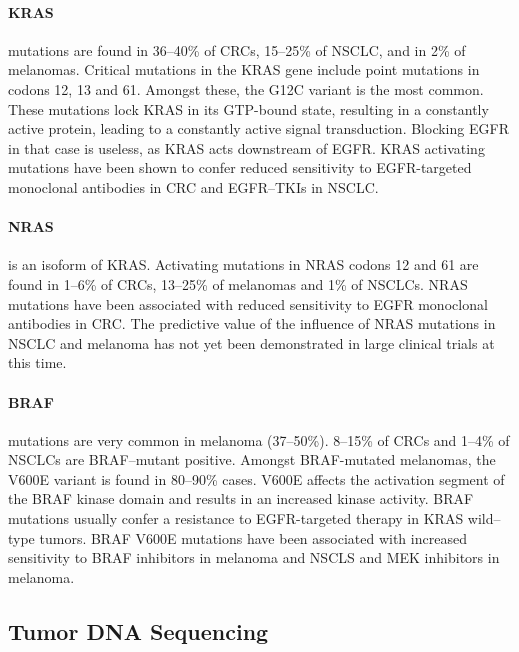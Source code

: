 {{      \paragraph{KRAS} mutations are found in 36--40\% of CRCs, 15--25\% of
      NSCLC, and in 2\% of melanomas. Critical mutations in the KRAS gene
      include point mutations in codons 12, 13 and 61. Amongst these, the G12C
      variant is the most common. These mutations lock KRAS in its GTP-bound
      state, resulting in a constantly active protein, leading to a constantly
      active signal transduction. Blocking EGFR in that case is useless, as KRAS
      acts downstream of EGFR. KRAS activating mutations have been shown to
      confer reduced sensitivity to EGFR-targeted monoclonal antibodies in CRC
      and EGFR--TKIs in NSCLC.

      \paragraph{NRAS} is an isoform of KRAS. Activating mutations in NRAS
      codons 12 and 61 are found in 1--6\% of CRCs, 13--25\% of melanomas and
      1\% of NSCLCs. NRAS mutations have been associated with reduced
      sensitivity to EGFR monoclonal antibodies in CRC. The predictive value of
      the influence of NRAS mutations in NSCLC and melanoma has not yet been
      demonstrated in large clinical trials at this time.

      \paragraph{BRAF} mutations are very common in melanoma (37--50\%). 8--15\%
      of CRCs and 1--4\% of NSCLCs are BRAF--mutant positive. Amongst
      BRAF-mutated melanomas, the V600E variant is found in 80--90\% cases.
      V600E affects the activation segment of the BRAF kinase domain and results
      in an increased kinase activity. BRAF mutations usually confer a
      resistance to EGFR-targeted therapy in KRAS wild--type tumors. BRAF V600E
      mutations have been associated with increased sensitivity to BRAF
      inhibitors in melanoma and NSCLS and MEK inhibitors in melanoma.

  \subsection{Tumor DNA Sequencing}

}}
